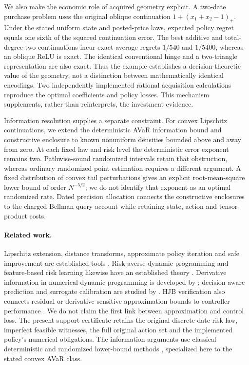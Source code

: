 We also make the economic role of acquired geometry explicit. A two-date purchase problem uses the original oblique continuation $1+(x_1+x_2-1)_+$. Under the stated uniform state and posted-price laws, expected policy regret equals one sixth of the squared continuation error. The best additive and total-degree-two continuations incur exact average regrets $1/540$ and $1/5400$, whereas an oblique ReLU is exact. The identical conventional hinge and a two-triangle representation are also exact. Thus the example establishes a decision-theoretic value of the geometry, not a distinction between mathematically identical encodings. Two independently implemented rational acquisition calculations reproduce the optimal coefficients and policy losses. This mechanism supplements, rather than reinterprets, the investment evidence.

Information resolution supplies a separate constraint. For convex Lipschitz continuations, we extend the deterministic AVaR information bound and constructive enclosure to known nonuniform densities bounded above and away from zero. At each fixed law and risk level the deterministic error exponent remains two. Pathwise-sound randomized intervals retain that obstruction, whereas ordinary randomized point estimation requires a different argument. A fixed distribution of convex tail perturbations gives an explicit root-mean-square lower bound of order $N^{-5/2}$; we do not identify that exponent as an optimal randomized rate. Dated precision allocation connects the constructive enclosures to the charged Bellman query account while retaining state, action and tensor-product costs.

\paragraph{Related work.}
Lipschitz extension, distance transforms, approximate policy iteration and safe improvement are established tools \citep{mcshane1934,felzenszwalb2012,munos2003,pirotta2013,scherrer2015,yang2020convex}. Risk-averse dynamic programming and feature-based risk learning likewise have an established theory \citep{ruszczynski2010risk,ruszczynski2014erratum,ruszczynskiyang2025}. Derivative information in numerical dynamic programming is developed by \citet{CaiJudd2015}; decision-aware prediction and surrogate calibration are studied by \citet{ElmachtoubGrigas2022,LiuGrigas2021}. HJB verification also connects residual or derivative-sensitive approximation bounds to controller performance \citep{JonesPeet2026,Liu2026HJB}. We do not claim the first link between approximation and control loss. The present support certificate retains the original discrete-date risk law, imperfect feasible witnesses, the full original action set and the implemented policy's numerical obligations. The information arguments use classical deterministic and randomized lower-bound methods \citep{Novak2015Integration97}, specialized here to the stated convex AVaR class.


